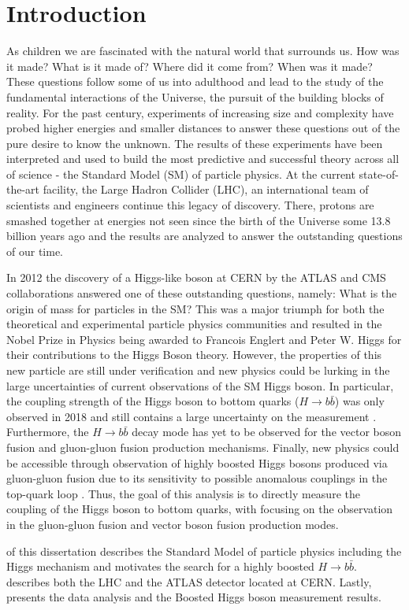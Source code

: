 \chapter{Introduction} \label{sec:intro}
As children we are fascinated with the natural world that surrounds us.  How
was it made? What is it made of? Where did it come from?  When was it made?
These questions follow some of us into adulthood and lead to the study of the
fundamental interactions of the Universe, the pursuit of the building blocks of
reality.  For the past century, experiments of increasing size and complexity
have probed higher energies and smaller distances to answer these questions out
of the pure desire to know the unknown.  The results of these experiments have
been interpreted and used to build the most predictive and successful theory
across all of science - the Standard Model (SM) of particle physics. At the
current state-of-the-art facility, the Large Hadron Collider (LHC), an
international team of scientists and engineers continue this legacy of
discovery.  There, protons are smashed together at energies not seen since the
birth of the Universe some 13.8 billion years ago and the results are analyzed
to answer the outstanding questions of our time.

In 2012 the discovery of a Higgs-like boson \cite{Higgs:1964ia, Higgs:1964pj,
Higgs:1966ev, Englert:1964et, Guralnik:1964eu} at CERN by the ATLAS and CMS
\cite{Aad:2012tfa,Chatrchyan:2012xdj} collaborations answered one of these
outstanding questions, namely: What is the origin of mass for particles in the
SM?  This was a major triumph for both the theoretical and experimental
particle physics communities and resulted in the Nobel Prize in Physics being
awarded to Francois Englert and Peter W. Higgs for their contributions to the
Higgs Boson theory. However, the properties of this new particle are still
under verification and new physics could be lurking in the large uncertainties
of current observations of the SM Higgs boson.  In particular, the coupling
strength of the Higgs boson to bottom quarks ($H \rightarrow b\bar{b}$) was
only observed in 2018 and still contains a large uncertainty on the measurement
\cite{HIGG-2018-04, CMS:2018abb}. Furthermore, the $H \rightarrow b\bar{b}$
decay mode has yet to be observed for the vector boson fusion and gluon-gluon
fusion production mechanisms.  Finally, new physics could be accessible through
observation of highly boosted Higgs bosons produced via gluon-gluon fusion due
to its sensitivity to possible anomalous couplings in the top-quark loop
\cite{Grojean:2013nya, Schlaffer:2014osa}.  Thus, the goal of this analysis is
to directly measure the coupling of the Higgs boson to bottom quarks, with
focusing on the observation in the gluon-gluon fusion and vector boson fusion
production modes. 

 of this dissertation describes the Standard Model of
particle physics including the Higgs mechanism and motivates the search for a
highly boosted $H \rightarrow b\bar{b}$.  describes both
the LHC and the ATLAS detector located at CERN. Lastly, 
presents the data analysis and the Boosted Higgs boson measurement results.

